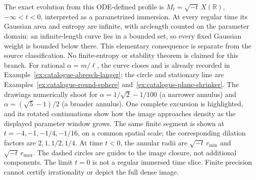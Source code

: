 \begin{example}
The exact evolution from this ODE-defined profile is
$M_t=\sqrt{-t}\,X(\mathbb R)$, $-\infty<t<0$, interpreted as a parametrized
immersion. At every regular time its Gaussian area and entropy are infinite,
with arclength counted on the parameter domain: an infinite-length curve lies
in a bounded set, so every fixed Gaussian weight is bounded below there.
This elementary consequence is separate from the source classification.
No finite-entropy or stability theorem is claimed for this branch.
For rational $\alpha=m/\ell$, the curve closes and is already recorded in
Example~\ref{ex:catalogue-abresch-langer}; the circle and stationary line are
Examples~\ref{ex:catalogue-round-sphere} and~\ref{ex:catalogue-plane-shrinker}.
The drawings numerically shoot for $\alpha=1/\sqrt2-1/100$ (a narrower annulus)
and $\alpha=(\sqrt5-1)/2$ (a broader annulus). One complete excursion is
highlighted, and its rotated continuations show how the image approaches
density as the displayed parameter window grows. The same finite segment is
shown at $t=-4,-1,-1/4,-1/16$, on a common spatial scale; the corresponding
dilation factors are $2,1,1/2,1/4$. At time $t<0$, the annular radii are
$\sqrt{-t}\,r_{\min}$ and $\sqrt{-t}\,r_{\max}$. The dashed circles are guides
to the image closure, not additional components. The limit $t=0$ is not a
regular immersed time slice. Finite precision cannot certify irrationality
or depict the full dense image.
\end{example}

